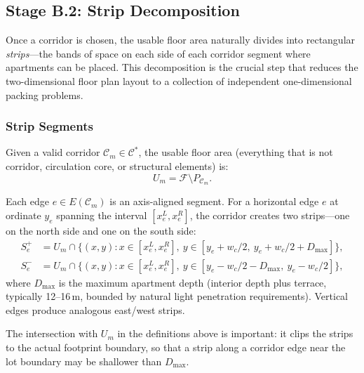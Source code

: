\documentclass[11pt,a4paper]{article}
\newcommand{\calF}{\mathcal{F}}
\newcommand{\calC}{\mathcal{C}}
\begin{document}
\subsection{Stage B.2: Strip Decomposition}\label{sec:strips}

Once a corridor is chosen, the usable floor area naturally divides into
rectangular \emph{strips}---the bands of space on each side of each
corridor segment where apartments can be placed. This decomposition is
the crucial step that reduces the two-dimensional floor plan layout
to a collection of independent one-dimensional packing problems.

\subsubsection{Strip Segments}

Given a valid corridor $\calC_m \in \calC^*$, the usable floor area
(everything that is not corridor, circulation core, or structural
elements) is:
\[
    U_m = \calF \setminus P_{\calC_m}.
\]

Each edge $e \in E(\calC_m)$ is an axis-aligned segment. For a horizontal
edge $e$ at ordinate $y_e$ spanning the interval $[x_e^L, x_e^R]$, the
corridor creates two strips---one on the north side and one on the south
side:
\begin{align}
    S_e^{+} &= U_m \cap \bigl\{(x,y) : x \in [x_e^L, x_e^R],\ y \in [y_e + w_c/2,\ y_e + w_c/2 + D_{\max}]\bigr\}, \label{eq:strip-north} \\
    S_e^{-} &= U_m \cap \bigl\{(x,y) : x \in [x_e^L, x_e^R],\ y \in [y_e - w_c/2 - D_{\max},\ y_e - w_c/2]\bigr\}, \label{eq:strip-south}
\end{align}
where $D_{\max}$ is the maximum apartment depth (interior depth plus
terrace, typically 12--16\,m, bounded by natural light penetration
requirements). Vertical edges produce analogous east/west strips.

The intersection with $U_m$ in the definitions above is important: it
clips the strips to the actual footprint boundary, so that a strip along
a corridor edge near the lot boundary may be shallower than $D_{\max}$.
\end{document}
